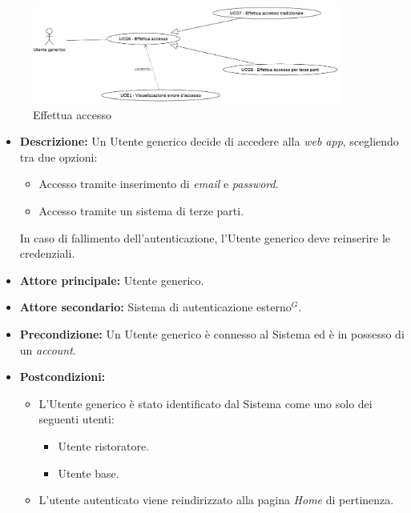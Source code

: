 \label{usecase:Effettua accesso}

\begin{figure}[h]
	\centering
	\includegraphics[width=0.9\textwidth]{./uml/UCG6-7-8.png} 
	\caption{Effettua accesso}
	\label{fig:UCG6-7-8}
  \end{figure}

\begin{itemize}
	\item \textbf{Descrizione:} Un Utente generico decide di accedere alla \textit{web app}, scegliendo tra due opzioni:
	\begin{itemize}
		\item Accesso tramite inserimento di \textit{email} e \textit{password}.
		\item Accesso tramite un sistema di terze parti.
	\end{itemize}
	In caso di fallimento dell'autenticazione, l'Utente generico deve reinserire le credenziali.

	\item \textbf{Attore principale:} Utente generico.
	\item \textbf{Attore secondario:} Sistema di autenticazione esterno$^G$.
	\item \textbf{Precondizione:}
	      Un Utente generico è connesso al Sistema ed è in possesso di un \textit{account}.

	\item \textbf{Postcondizioni:}
		\begin{itemize}      
			\item L'Utente generico è stato identificato dal Sistema come uno solo dei seguenti utenti:
	      		\begin{itemize}
		      		\item Utente ristoratore.
		      		\item Utente base.
	      		\end{itemize}
		  	\item L'utente autenticato viene reindirizzato alla pagina \textit{Home} di pertinenza.
		\end{itemize}


\end{itemize}
